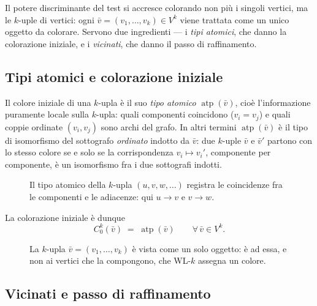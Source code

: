 Il potere discriminante del test si accresce colorando non più i singoli vertici, ma le
$k$-uple di vertici: ogni $\bar v = (v_1,\dots,v_k) \in V^{k}$ viene trattata come un
unico oggetto da colorare. Servono due ingredienti --- i \emph{tipi atomici}, che danno
la colorazione iniziale, e i \emph{vicinati}, che danno il passo di raffinamento.

\subsection{Tipi atomici e colorazione iniziale}

Il colore iniziale di una $k$-upla è il suo \emph{tipo atomico}
$\operatorname{atp}(\bar v)$, cioè l'informazione puramente locale sulla $k$-upla:
quali componenti coincidono ($v_i = v_j$) e quali coppie ordinate $(v_i,v_j)$ sono archi
del grafo. In altri termini $\operatorname{atp}(\bar v)$ è il tipo di isomorfismo del
sottografo \emph{ordinato} indotto da $\bar v$: due $k$-uple $\bar v$ e $\bar v'$
partono con lo stesso colore se e solo se la corrispondenza $v_i \mapsto v_i'$,
componente per componente, è un isomorfismo fra i due sottografi indotti.

\begin{figure}[H]
  \centering
  
  \caption{Il tipo atomico della $k$-upla $(u,v,w,\dots)$ registra le coincidenze fra le
  componenti e le adiacenze: qui $u \to v$ e $v \to w$.}
  \label{fig:wlk-tipo-atomico}
\end{figure}


La colorazione iniziale è dunque
\[
  C_0^k(\bar v) \;=\; \operatorname{atp}(\bar v)
  \qquad \forall\, \bar v \in V^{k} .
\]

\begin{figure}[H]
  \centering
  
  \caption{La $k$-upla $\bar v = (v_1,\dots,v_k)$ è vista come un solo oggetto: è ad
  essa, e non ai vertici che la compongono, che WL-$k$ assegna un colore.}
  \label{fig:wlk-tupla}
\end{figure}

\subsection{Vicinati e passo di raffinamento}

